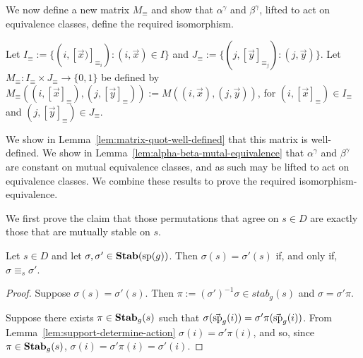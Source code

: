 \documentclass[../paper.tex]{subfiles}
\begin{document}

We now define a new matrix $M_{\equiv}$ and show that $\alpha^{\gamma}$ and
$\beta^{\gamma}$, lifted to act on equivalence classes, define the required
isomorphism.

Let $I_{\equiv} := \{(i, [\vec{x})]_{\equiv_i}) : (i, \vec{x}) \in I\}$ and
$J_\equiv := \{(j, [\vec{y}]_{\equiv_j}) : (j, \vec{y})\}$. Let $M_{\equiv} :
I_{\equiv} \times J_{\equiv} \rightarrow \{0,1\}$ be defined by $M_\equiv ((i,
[\vec{x}]_\equiv), (j, [\vec{y}]_\equiv)) := M((i,\vec{x}), (j, \vec{y}))$, for
$(i, [\vec{x}]_{\equiv}) \in I_\equiv$ and $(j, [\vec{y}]_{\equiv}) \in
J_\equiv$.

We show in Lemma~\ref{lem:matrix-quot-well-defined} that this matrix is
well-defined. We show in Lemma~\ref{lem:alpha-beta-mutal-equivalence} that
$\alpha^{\gamma}$ and $\beta^{\gamma}$ are constant on mutual equivalence
classes, and as such may be lifted to act on equivalence classes. We combine
these results to prove the required isomorphism-equivalence.

We first prove the claim that those permutations that agree on $s \in D$ are
exactly those that are mutually stable on $s$.

\begin{lem}
	Let $s \in D$ and let $\sigma, \sigma' \in \text{\textbf{Stab}}(\text{sp}(g))$. Then $\sigma(s)
	= \sigma' (s)$ if, and only if, $\sigma \equiv_s \sigma'$.
	\label{lem:functions-mutual-equivalence}
\end{lem}
\begin{proof}
	Suppose $\sigma(s) = \sigma'(s)$. Then $\pi := (\sigma')^{-1}\sigma \in
	stab_g(s)$ and $\sigma = \sigma' \pi$.
		
	Suppose there exists $\pi \in \text{\textbf{Stab}}_g(s)$ such that $\sigma
	(\vec{\text{sp}}_g(i))= \sigma' \pi (\vec{\text{sp}}_g(i))$. From Lemma~\ref{lem:support-determine-action} $\sigma (i) = \sigma' \pi (i)$, and so,
	since $\pi \in \text{\textbf{Stab}}_g(s)$, $\sigma(i) = \sigma' \pi (i) = \sigma' (i)$.
\end{proof}

\end{document}
